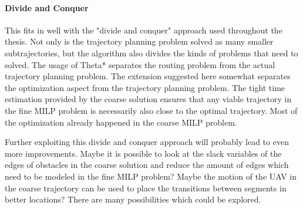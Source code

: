 \paragraph{Divide and Conquer}
This fits in well with the "divide and conquer" approach used throughout the thesis. Not only is the trajectory planning problem solved as many smaller subtrajectories, but the algorithm also divides the kinds of problems that need to solved. The usage of Theta* separates the routing problem from the actual trajectory planning problem. The extension suggested here somewhat separates the optimization aspect from the trajectory planning problem. The tight time estimation provided by the coarse solution ensures that any viable trajectory in the fine MILP problem is necessarily also close to the optimal trajectory. Most of the optimization already happened in the coarse MILP problem.
\par
Further exploiting this divide and conquer approach will probably lead to even more improvements. Maybe it is possible to look at the slack variables of the edges of obstacles in the coarse solution and reduce the amount of edges which need to be modeled in the fine MILP problem? Maybe the motion of the UAV in the coarse trajectory can be used to place the transitions between segments in better locations? There are many possibilities which could be explored.

